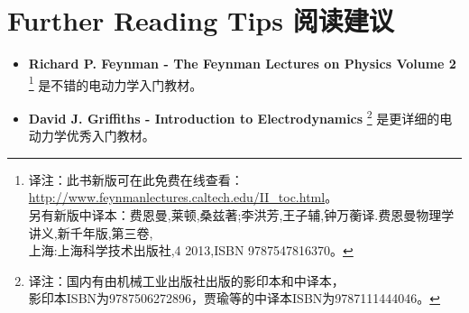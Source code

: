 \section*{Further Reading Tips \quad 阅读建议}
\begin{itemize}
    \item {\bfseries Richard P. Feynman - The Feynman Lectures on Physics Volume 2}%
    \footnote{译注：此书新版可在此免费在线查看： \url{http://www.feynmanlectures.caltech.edu/II_toc.html}。\\另有新版中译本：费恩曼,莱顿,桑兹著;李洪芳,王子辅,钟万蘅译.费恩曼物理学讲义,新千年版,第三卷,\\上海:上海科学技术出版社,4 2013,ISBN 9787547816370。} %
    是不错的电动力学入门教材。
    \item {\bfseries David J. Griffiths - Introduction to Electrodynamics}%
    \footnote{译注：国内有由机械工业出版社出版的影印本和中译本，\\影印本ISBN为9787506272896，贾瑜等的中译本ISBN为9787111444046。}%
    是更详细的电动力学优秀入门教材。
\end{itemize}
